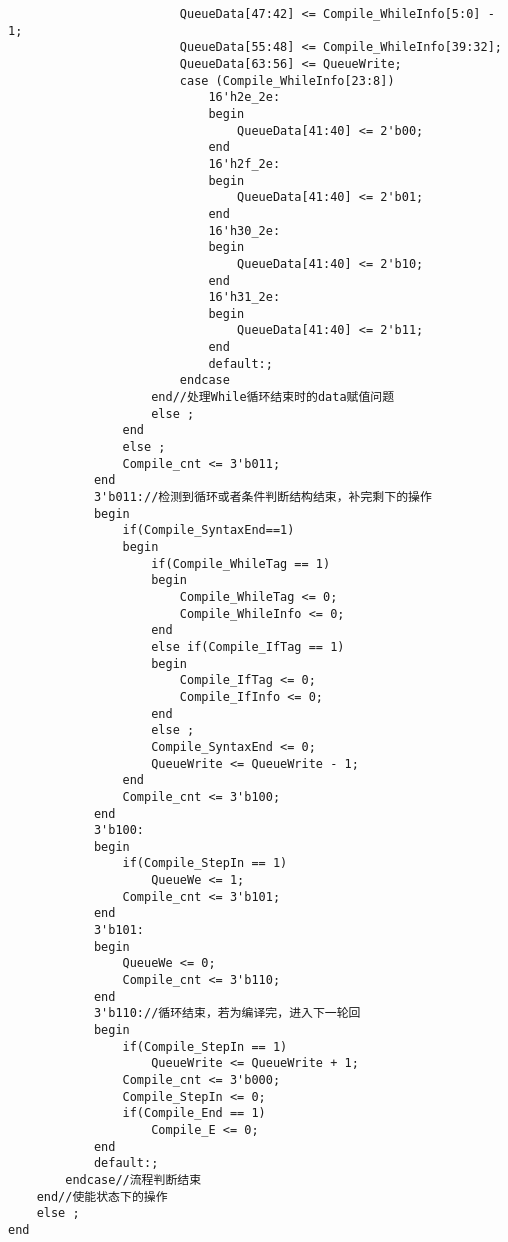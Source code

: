 \documentclass[lang=cn,11pt,a4paper]{elegantpaper}
\begin{document}
\begin{lstlisting}
                        QueueData[47:42] <= Compile_WhileInfo[5:0] - 1;
                        QueueData[55:48] <= Compile_WhileInfo[39:32];
                        QueueData[63:56] <= QueueWrite;
                        case (Compile_WhileInfo[23:8])
                            16'h2e_2e:
                            begin
                                QueueData[41:40] <= 2'b00;
                            end
                            16'h2f_2e:
                            begin
                                QueueData[41:40] <= 2'b01;
                            end
                            16'h30_2e:
                            begin
                                QueueData[41:40] <= 2'b10;
                            end
                            16'h31_2e:
                            begin
                                QueueData[41:40] <= 2'b11;
                            end
                            default:;
                        endcase
                    end//处理While循环结束时的data赋值问题
                    else ;
                end
                else ;
                Compile_cnt <= 3'b011;
            end
            3'b011://检测到循环或者条件判断结构结束，补完剩下的操作
            begin
                if(Compile_SyntaxEnd==1)
                begin
                    if(Compile_WhileTag == 1)
                    begin
                        Compile_WhileTag <= 0;
                        Compile_WhileInfo <= 0;
                    end
                    else if(Compile_IfTag == 1)
                    begin
                        Compile_IfTag <= 0;
                        Compile_IfInfo <= 0;
                    end
                    else ;
                    Compile_SyntaxEnd <= 0;
                    QueueWrite <= QueueWrite - 1;
                end
                Compile_cnt <= 3'b100;
            end
            3'b100:
            begin
                if(Compile_StepIn == 1)
                    QueueWe <= 1;
                Compile_cnt <= 3'b101;
            end
            3'b101:
            begin
                QueueWe <= 0;
                Compile_cnt <= 3'b110;
            end
            3'b110://循环结束，若为编译完，进入下一轮回
            begin
                if(Compile_StepIn == 1)
                    QueueWrite <= QueueWrite + 1;
                Compile_cnt <= 3'b000;
                Compile_StepIn <= 0;
                if(Compile_End == 1)
                    Compile_E <= 0;
            end
            default:;
        endcase//流程判断结束
    end//使能状态下的操作
	else ;
end
\end{lstlisting}
\end{document}
